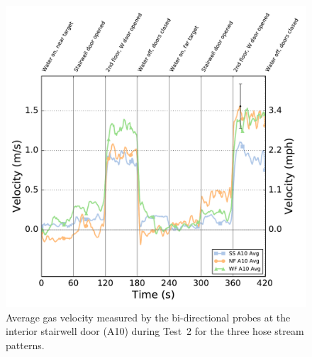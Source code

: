 \documentclass[12pt,oneside]{book}
\begin{document}
\begin{figure}[!ht]
	\includegraphics[width=\columnwidth]{../Figures/Plots/Test_16_West_063014_BDP_A10_stream_avgs}
	\caption[Average gas velocity through the interior stairwell door during Test~2 for the three hose stream patterns.]{Average gas velocity measured by the bi-directional probes at the interior stairwell door (A10) during Test~2 for the three hose stream patterns.}
	\label{fig:Test_2_BDP_A10_Avg_All}
\end{figure}
\end{document}
